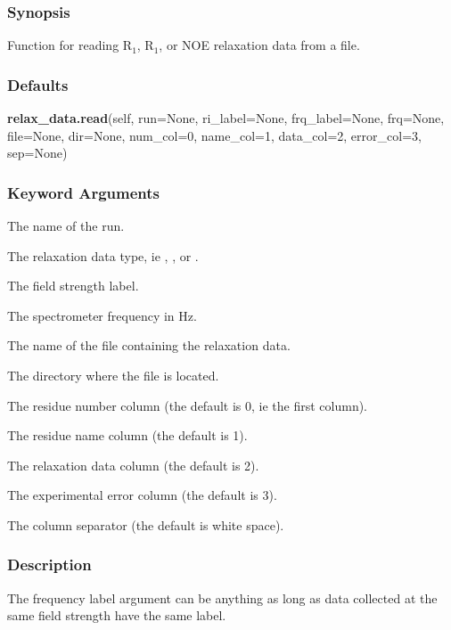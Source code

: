 \subsubsection{Synopsis}

Function for reading R$_1$, R$_1$, or NOE relaxation data from a file.

\subsubsection{Defaults}

\textsf{\textbf{relax\_data.read}(self, run=None, ri\_label=None, frq\_label=None, frq=None, file=None, dir=None, num\_col=0, name\_col=1, data\_col=2, error\_col=3, sep=None)}


\subsubsection{Keyword Arguments}


  The name of the run.

  The relaxation  data type, ie 
, 
, or 
.

  The field strength label.

  The spectrometer frequency in Hz.

  The name of the file containing the relaxation  data.

  The directory where the file is located.

  The residue number column (the default is 0, ie the first column).

  The residue name column (the default is 1).

  The relaxation  data column (the default is 2).

  The experimental error column (the default is 3).

  The column separator (the default is white space).

\subsubsection{Description}

The frequency label argument can be anything as long as data collected at the same field
strength have the same label.


